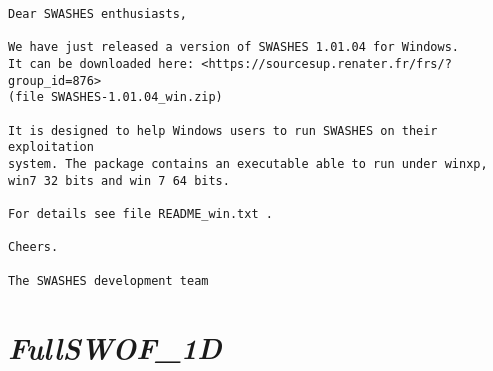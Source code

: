 \documentclass[a4paper, 11pt]{article}
\newcommand{\FullSWOFoneD}{\emph{FullSWOF\_1D}}
\begin{document}
\begin{enumerate}
\begin{verbatim}
Dear SWASHES enthusiasts,

We have just released a version of SWASHES 1.01.04 for Windows.
It can be downloaded here: <https://sourcesup.renater.fr/frs/?group_id=876> 
(file SWASHES-1.01.04_win.zip)

It is designed to help Windows users to run SWASHES on their exploitation 
system. The package contains an executable able to run under winxp, 
win7 32 bits and win 7 64 bits.

For details see file README_win.txt .

Cheers.

The SWASHES development team 
\end{verbatim}
\end{enumerate}


\section{\FullSWOFoneD{}}
\end{document}
